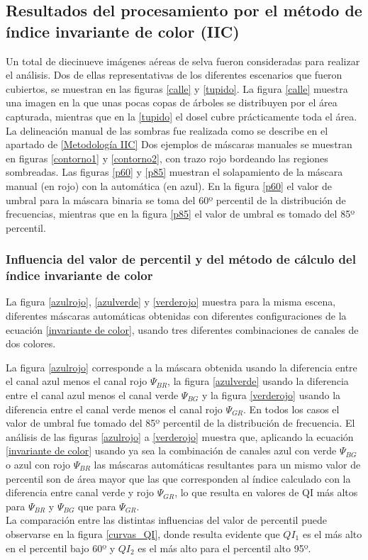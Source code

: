 \subsection{Resultados del procesamiento por el método de índice invariante de color (IIC)} \label{Resultados IIC}
Un total de diecinueve imágenes aéreas de selva fueron consideradas para realizar el análisis. Dos de ellas representativas de los diferentes escenarios que fueron cubiertos, se muestran en las figuras \ref{calle} y \ref{tupido}. La figura \ref{calle} muestra una imagen en la que unas pocas copas de árboles se distribuyen por el área capturada, mientras que en la \ref{tupido} el dosel cubre prácticamente toda el área. La delineación manual de las sombras fue realizada como se describe en el apartado de \ref{Metodología IIC}
Dos ejemplos de máscaras manuales se muestran en figuras \ref{contorno1} y \ref{contorno2}, con trazo rojo bordeando las regiones sombreadas. Las figuras \ref{p60} y \ref{p85} muestran el solapamiento de la máscara manual (en rojo) con la automática (en azul). En la figura \ref{p60} el valor de umbral para la máscara binaria se toma del 60º percentil de la distribución de frecuencias, mientras que en la figura \ref{p85} el valor de umbral es tomado del 85º percentil.

\subsubsection{Influencia del valor de percentil y del método de cálculo del índice invariante de color}

La figura \ref{azulrojo}, \ref{azulverde} y \ref{verderojo} muestra para la misma escena, diferentes máscaras automáticas obtenidas con diferentes configuraciones de la ecuación \ref{invariante de color}, usando tres diferentes combinaciones de canales de dos colores.



La figura \ref{azulrojo} corresponde a la máscara obtenida usando la diferencia entre el canal azul menos el canal rojo $\Psi_{BR}$, la figura \ref{azulverde} usando la diferencia entre el canal azul menos el canal verde $\Psi_{BG}$ y la figura \ref{verderojo} usando la diferencia entre el canal verde menos el canal rojo $\Psi_{GR}$. En todos los casos el valor de umbral fue tomado del 85º percentil de la distribución de frecuencia. El análisis de las figuras \ref{azulrojo} a \ref{verderojo} muestra que, aplicando la ecuación \ref{invariante de color} usando ya sea la combinación de canales azul con verde $\Psi_{BG}$ o azul con rojo $\Psi_{BR}$  las máscaras automáticas resultantes para un mismo valor de percentil son de área mayor que las que corresponden al índice calculado con la diferencia entre canal verde y rojo $\Psi_{GR}$, lo que resulta en valores de QI más altos para $\Psi_{BR}$ y $\Psi_{BG}$ que para $\Psi_{GR}$. \\
La comparación entre las distintas influencias del valor de percentil puede observarse en la figura \ref{curvas_QI}, donde resulta evidente que $QI_1$ es el más alto en el percentil bajo 60º y $QI_2$ es el más alto para el percentil alto 95º. 

